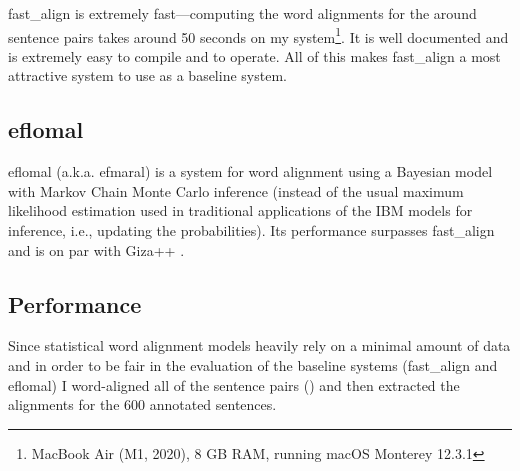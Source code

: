 fast\_align is extremely fast---computing the word alignments for the around  sentence pairs takes around 50 seconds on my system\footnote{MacBook Air (M1, 2020), 8 GB RAM, running macOS Monterey 12.3.1}. 
It is well documented and is extremely easy to compile and to operate. 
All of this makes fast\_align a most attractive system to use as a baseline system.

\subsection{eflomal}
eflomal (a.k.a. efmaral\footnotemark) is a system for word alignment using a Bayesian model with Markov Chain Monte Carlo inference (instead of the usual maximum likelihood estimation used in traditional applications of the IBM models for inference, i.e., updating the probabilities). 
Its performance surpasses fast\_align and is on par with Giza++ \autocite{Ostling2016efmaral}.



\subsection{Performance}
Since statistical word alignment models heavily rely on a minimal amount of data and in order to be fair in the evaluation of the baseline systems (fast\_align and eflomal) I word-aligned all of the sentence pairs () and then extracted the alignments for the 600 annotated sentences.
 


